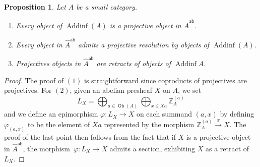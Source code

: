 \documentclass[10pt, english, a4paper, nothms]{amsart}
\theoremstyle{plain}
\newtheorem{prop}[theorem]{Proposition}
\theoremstyle{remark}
\theoremstyle{definition}
\numberwithin{equation}{theorem}
\newcommand\Z{\mathbb{Z}}
\newcommand{\Ob}{\operatorname{\mathsf{Ob}}}
\newcommand{\Addinf}{\operatorname{\mathrm{Addinf}}}
\newcommand{\Wh}[2]{\Z_{#1}^{\left(#2\right)}}
\newcommand{\prefab}[1]{\widehat{ #1 }^{\mathsf{ab}}}
\begin{document}
\begin{prop}\label{prop:resAddinf}
Let $A$ be a small category. \begin{enumerate}
\item Every object of $\Addinf(A)$ is a projective object in
$\prefab{A}$.
\item Every object in $\prefab{A}$ admits a projective resolution by
objects of $\Addinf(A)$.
\item Projectives objects in $\prefab{A}$ are retracts of objects of
$\Addinf{A}$.
\end{enumerate} 
\end{prop}
\begin{proof}
The proof of $(1)$ is straightforward since coproducts of projectives
are projectives. For $(2)$, given an abelian presheaf $X$ on $A$, we
set 
\[
  L_X=\bigoplus_{a\in\Ob(A)}\bigoplus_{x\in Xa}\Wh{A}{a}
\]
and we define an epimorphism $\varphi: L_X \to X$ on each summand
$(a,x)$ by defining $\varphi_{(a,x)}$ to be the element of $Xa$ represented
by the morphism $\Wh{A}{a}\xrightarrow{x} X$. The proof of the
last point then follows from the fact that if $X$ is a projective
object in $\prefab{A}$, the morphism~$\varphi: L_X \to X$ admits a
section, exhibiting $X$ as a retract of $L_X$.
\end{proof}
\end{document}
